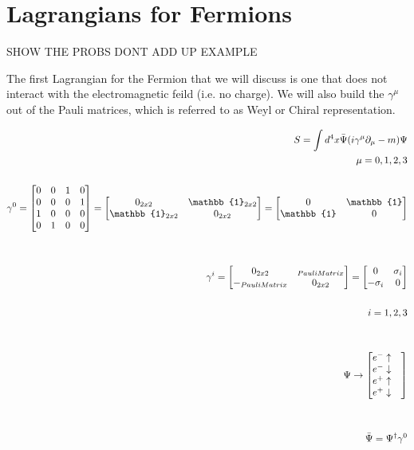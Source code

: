 \documentclass[aps,secnumarabic,nobalancelastpage,amsmath,amssymb,
nofootinbib]{revtex4}
\begin{document}
\section{Lagrangians for Fermions}

SHOW THE PROBS DONT ADD UP EXAMPLE

The first Lagrangian for the Fermion that we will discuss is one that does not interact with the electromagnetic feild (i.e. no charge). We will also build the $\gamma^\mu$ out of the Pauli matrices, which is referred to as Weyl or Chiral representation.

\begin{equation}
\begin{split}
S=\int d^4 x \bar{\Psi}(i \gamma^\mu \partial_\mu - m)\Psi\\
\mu=0,1,2,3\\
\\
\gamma^0 
=\begin{bmatrix}
    0    &    0    &    1    &    0    \\
    0    &    0    &    0    &    1    \\
    1    &    0    &    0    &    0    \\
    0    &    1    &    0    &    0
\end{bmatrix} 
=\begin{bmatrix}
    0_{2x2}                    & \mathbb{1}_{2x2}  \\
    \mathbb{1}_{2x2}    &    0_{2x2}    
\end{bmatrix} 
=\begin{bmatrix}
    0                    & \mathbb{1}  \\
    \mathbb{1}    &    0    
\end{bmatrix} 
\\
\\\\
\gamma^i 
=\begin{bmatrix}
    0_{2x2}                    & _{PauliMatrix}  \\
    - \tiny _{PauliMatrix}    &    0_{2x2}    
\end{bmatrix} 
=\begin{bmatrix}
    0                    & \sigma_i \\
    -\sigma_i    &    0    
\end{bmatrix} \\\\
i=1,2,3\\
\\\\
\Psi \rightarrow 
\begin{bmatrix}
    e^-  \uparrow        &   \\
    e^-  \downarrow    &   \\
    e^+ \uparrow        &    \\
    e^+ \downarrow       &    
\end{bmatrix} \\
\\
\\
\bar{\Psi} = \Psi^\dagger \gamma^0\\
\, \label{eq:23}
\end{split}
\end{equation} \\
\end{document}
